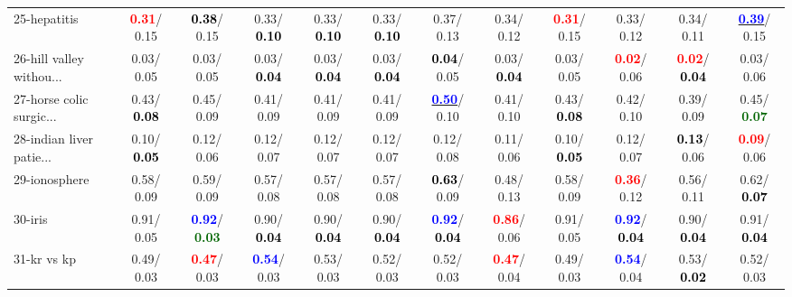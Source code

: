 \begin{table}[h]
\begin{center}
{\begin{tabular}{lc|c|c|c|c|c|c|c|c|c|c}
25-hepatitis & \textcolor{red}{\textbf{  0.31}}/  0.15 & \textcolor{black}{\textbf{  0.38}}/  0.15 &   0.33/\textcolor{black}{\textbf{  0.10}} &   0.33/\textcolor{black}{\textbf{  0.10}} &   0.33/\textcolor{black}{\textbf{  0.10}} &   0.37/  0.13 &   0.34/  0.12 & \textcolor{red}{\textbf{  0.31}}/  0.15 &   0.33/  0.12 &   0.34/  0.11 & \underline{\textcolor{blue}{\textbf{  0.39}}}/  0.15 \\
26-hill valley withou... &   0.03/  0.05 &   0.03/  0.05 &   0.03/\textcolor{black}{\textbf{  0.04}} &   0.03/\textcolor{black}{\textbf{  0.04}} &   0.03/\textcolor{black}{\textbf{  0.04}} & \textcolor{black}{\textbf{  0.04}}/  0.05 &   0.03/\textcolor{black}{\textbf{  0.04}} &   0.03/  0.05 & \textcolor{red}{\textbf{  0.02}}/  0.06 & \textcolor{red}{\textbf{  0.02}}/\textcolor{black}{\textbf{  0.04}} &   0.03/  0.06 \\
27-horse colic surgic... &   0.43/\textcolor{black}{\textbf{  0.08}} &   0.45/  0.09 &   0.41/  0.09 &   0.41/  0.09 &   0.41/  0.09 & \underline{\textcolor{blue}{\textbf{  0.50}}}/  0.10 &   0.41/  0.10 &   0.43/\textcolor{black}{\textbf{  0.08}} &   0.42/  0.10 &   0.39/  0.09 &   0.45/\textcolor{darkgreen}{\textbf{  0.07}} \\
28-indian liver patie... &   0.10/\textcolor{black}{\textbf{  0.05}} &   0.12/  0.06 &   0.12/  0.07 &   0.12/  0.07 &   0.12/  0.07 &   0.12/  0.08 &   0.11/  0.06 &   0.10/\textcolor{black}{\textbf{  0.05}} &   0.12/  0.07 & \textcolor{black}{\textbf{  0.13}}/  0.06 & \textcolor{red}{\textbf{  0.09}}/  0.06 \\ \hline
29-ionosphere &   0.58/  0.09 &   0.59/  0.09 &   0.57/  0.08 &   0.57/  0.08 &   0.57/  0.08 & \textcolor{black}{\textbf{  0.63}}/  0.09 &   0.48/  0.13 &   0.58/  0.09 & \textcolor{red}{\textbf{  0.36}}/  0.12 &   0.56/  0.11 &   0.62/\textcolor{black}{\textbf{  0.07}} \\
30-iris &   0.91/  0.05 & \textcolor{blue}{\textbf{  0.92}}/\textcolor{darkgreen}{\textbf{  0.03}} &   0.90/\textcolor{black}{\textbf{  0.04}} &   0.90/\textcolor{black}{\textbf{  0.04}} &   0.90/\textcolor{black}{\textbf{  0.04}} & \textcolor{blue}{\textbf{  0.92}}/\textcolor{black}{\textbf{  0.04}} & \textcolor{red}{\textbf{  0.86}}/  0.06 &   0.91/  0.05 & \textcolor{blue}{\textbf{  0.92}}/\textcolor{black}{\textbf{  0.04}} &   0.90/\textcolor{black}{\textbf{  0.04}} &   0.91/\textcolor{black}{\textbf{  0.04}} \\
31-kr vs kp &   0.49/  0.03 & \textcolor{red}{\textbf{  0.47}}/  0.03 & \textcolor{blue}{\textbf{  0.54}}/  0.03 &   0.53/  0.03 &   0.52/  0.03 &   0.52/  0.03 & \textcolor{red}{\textbf{  0.47}}/  0.04 &   0.49/  0.03 & \textcolor{blue}{\textbf{  0.54}}/  0.04 &   0.53/\textcolor{black}{\textbf{  0.02}} &   0.52/  0.03 \\

\end{tabular}}
\end{center}
\end{table}
